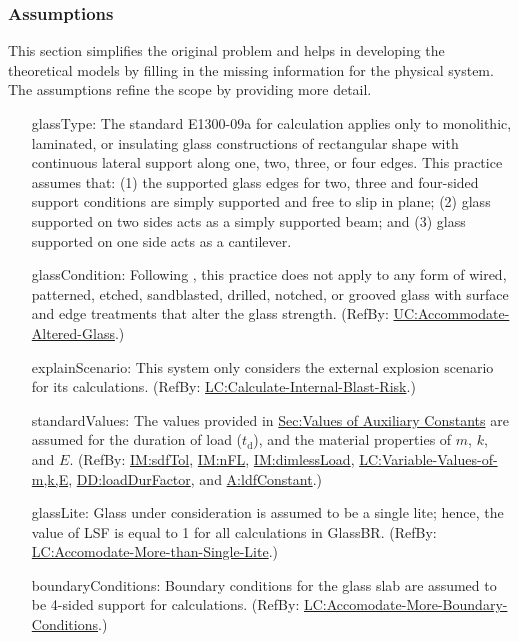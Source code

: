 \documentclass[12pt]{article}
\begin{document}
\subsubsection{Assumptions}
\label{Sec:Assumps}
This section simplifies the original problem and helps in developing the theoretical models by filling in the missing information for the physical system. The assumptions refine the scope by providing more detail.

\begin{itemize}
\item[glassType:\phantomsection\label{assumpGT}]{The standard E1300-09a for calculation applies only to monolithic, laminated, or insulating glass constructions of rectangular shape with continuous lateral support along one, two, three, or four edges. This practice assumes that: (1) the supported glass edges for two, three and four-sided support conditions are simply supported and free to slip in plane; (2) glass supported on two sides acts as a simply supported beam; and (3) glass supported on one side acts as a cantilever.}
\item[glassCondition:\phantomsection\label{assumpGC}]{Following \cite[(pg. 1)]{astm2009}, this practice does not apply to any form of wired, patterned, etched, sandblasted, drilled, notched, or grooved glass with surface and edge treatments that alter the glass strength. (RefBy: \hyperref[accAlteredGlass]{UC:Accommodate-Altered-Glass}.)}
\item[explainScenario:\phantomsection\label{assumpES}]{This system only considers the external explosion scenario for its calculations. (RefBy: \hyperref[calcInternalBlastRisk]{LC:Calculate-Internal-Blast-Risk}.)}
\item[standardValues:\phantomsection\label{assumpSV}]{The values provided in \hyperref[Sec:AuxConstants]{Sec:Values of Auxiliary Constants} are assumed for the duration of load (${t_{\text{d}}}$), and the material properties of $m$, $k$, and $E$. (RefBy: \hyperref[IM:sdfTol]{IM:sdfTol}, \hyperref[IM:nFL]{IM:nFL}, \hyperref[IM:dimlessLoad]{IM:dimlessLoad}, \hyperref[varValsOfmkE]{LC:Variable-Values-of-m,k,E}, \hyperref[DD:loadDurFactor]{DD:loadDurFactor}, and \hyperref[assumpLDFC]{A:ldfConstant}.)}
\item[glassLite:\phantomsection\label{assumpGL}]{Glass under consideration is assumed to be a single lite; hence, the value of LSF is equal to 1 for all calculations in GlassBR. (RefBy: \hyperref[accMoreThanSingleLite]{LC:Accomodate-More-than-Single-Lite}.)}
\item[boundaryConditions:\phantomsection\label{assumpBC}]{Boundary conditions for the glass slab are assumed to be 4-sided support for calculations. (RefBy: \hyperref[accMoreBoundaryConditions]{LC:Accomodate-More-Boundary-Conditions}.)}

\end{itemize}
\end{document}
